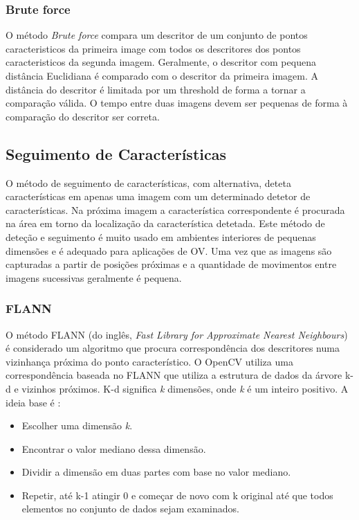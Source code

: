 \subsubsection{Brute force}

O método \textit{Brute force} compara um descritor de um conjunto de pontos caracteristicos da primeira image com todos os descritores dos pontos caracteristicos da segunda imagem. Geralmente, o descritor com pequena distância Euclidiana é comparado com o descritor da primeira imagem. A distância do descritor é limitada por um threshold de forma a tornar a comparação válida. O tempo entre duas imagens devem ser pequenas de forma à comparação do descritor ser correta.


\subsection{Seguimento de Características}

O método de seguimento de características, com alternativa, deteta características em apenas uma imagem com um determinado detetor de características. Na próxima imagem a característica correspondente é procurada na área em torno da localização da característica detetada.
Este método de deteção e seguimento é muito usado em ambientes interiores de pequenas dimensões e é adequado para aplicações de OV. 
Uma vez que as imagens são capturadas a partir de posições próximas e a quantidade de movimentos entre imagens sucessivas geralmente é pequena. 

\subsubsection{FLANN}

O método FLANN (do inglês, \textit{Fast Library for Approximate Nearest Neighbours}) é considerado um algoritmo que procura correspondência dos descritores numa vizinhança próxima do ponto característico.  O OpenCV utiliza uma correspondência baseada no FLANN que utiliza a estrutura de dados da árvore k-d e vizinhos próximos. K-d significa \textit{k} dimensões, onde \textit{k} é um inteiro positivo. A ideia base é :
\begin{itemize}
	\item Escolher uma dimensão \textit{k}.
	\item Encontrar o valor mediano dessa dimensão.
	\item Dividir a dimensão em duas partes com base no valor mediano.
	\item Repetir, até k-1 atingir 0 e começar de novo com k original até que todos elementos no conjunto de dados sejam examinados.
\end{itemize}

